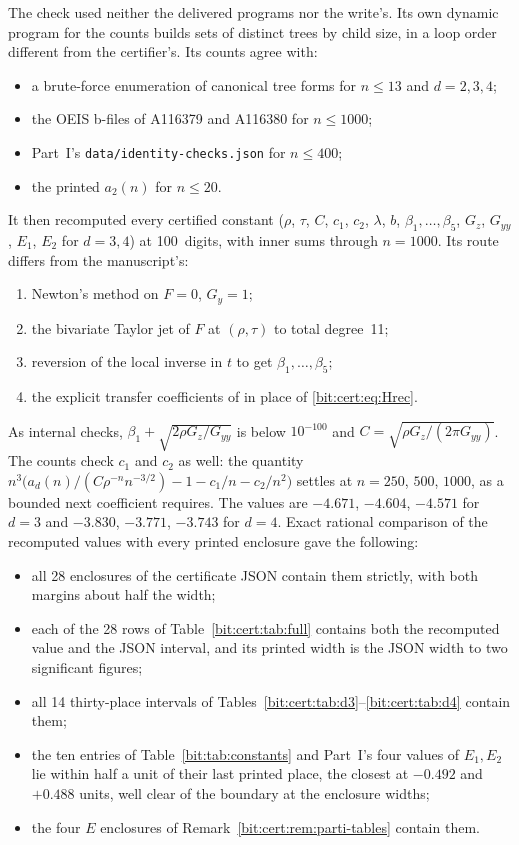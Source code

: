 \documentclass[11pt]{article}
\theoremstyle{definition}\newtheorem{definition}[theorem]{Definition}
\theoremstyle{remark}\newtheorem{remark}[theorem]{Remark}
\begin{document}
The check used neither the delivered programs nor the write's. Its own
dynamic program for the counts builds sets of distinct trees by child size, in
a loop order different from the certifier's. Its counts agree with:
\begin{itemize}[leftmargin=*,itemsep=0.15em]
\item a brute-force enumeration of canonical tree forms for $n\le13$ and
 $d=2,3,4$;
\item the OEIS b-files of A116379 and A116380 for $n\le1000$;
\item Part~I's \texttt{data/identity-checks.json} for $n\le400$;
\item the printed $a_2(n)$ for $n\le20$.
\end{itemize}
It then recomputed every certified constant ($\rho$, $\tau$, $C$, $c_1$,
$c_2$, $\lambda$, $b$, $\beta_1,\ldots,\beta_5$, $G_z$, $G_{yy}$, $E_1$,
$E_2$ for $d=3,4$) at 100~digits, with inner sums through $n=1000$. Its route
differs from the manuscript's:
\begin{enumerate}[leftmargin=*,itemsep=0.15em]
\item Newton's method on $F=0$, $G_y=1$;
\item the bivariate Taylor jet of $F$ at $(\rho,\tau)$ to total degree~11;
\item reversion of the local inverse in $t$ to get $\beta_1,\ldots,\beta_5$;
\item the explicit transfer coefficients of \cite[Theorem~VI.1]{fs} in place
 of \eqref{bit:cert:eq:Hrec}.
\end{enumerate}
As internal checks, $\beta_1+\sqrt{2\rho G_z/G_{yy}}$ is below $10^{-100}$
and $C=\sqrt{\rho G_z/(2\pi G_{yy})}$. The counts check $c_1$ and $c_2$ as
well: the quantity $n^3\bigl(a_d(n)/(C\rho^{-n}n^{-3/2})-1-c_1/n-c_2/n^2\bigr)$
settles at $n=250$, $500$, $1000$, as a bounded next coefficient requires. The
values are $-4.671$, $-4.604$, $-4.571$ for $d=3$ and $-3.830$, $-3.771$,
$-3.743$ for $d=4$. Exact rational comparison of the recomputed values with
every printed enclosure gave the following:
\begin{itemize}[leftmargin=*,itemsep=0.15em]
\item all 28 enclosures of the certificate JSON contain them strictly, with
 both margins about half the width;
\item each of the 28 rows of Table~\ref{bit:cert:tab:full} contains both the
 recomputed value and the JSON interval, and its printed width is the JSON
 width to two significant figures;
\item all 14 thirty-place intervals of
 Tables~\ref{bit:cert:tab:d3}--\ref{bit:cert:tab:d4} contain them;
\item the ten entries of Table~\ref{bit:tab:constants} and Part~I's four
 values of $E_1,E_2$ lie within half a unit of their last printed place, the
 closest at $-0.492$ and $+0.488$ units, well clear of the boundary at the
 enclosure widths;
\item the four $E$ enclosures of Remark~\ref{bit:cert:rem:parti-tables}
 contain them.
\end{itemize}
\end{document}

